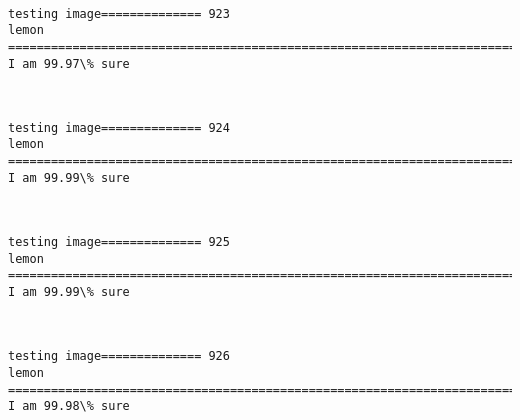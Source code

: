 \documentclass[11pt]{article}
\begin{document}
    \begin{center}
    \end{center}
    { \hspace*{\fill} \\}
    
    \begin{Verbatim}[commandchars=\\\{\}]
testing image============== 923
lemon
============================================================================
I am 99.97\% sure

    \end{Verbatim}

    \begin{center}
    \end{center}
    { \hspace*{\fill} \\}
    
    \begin{Verbatim}[commandchars=\\\{\}]
testing image============== 924
lemon
============================================================================
I am 99.99\% sure

    \end{Verbatim}

    \begin{center}
    \end{center}
    { \hspace*{\fill} \\}
    
    \begin{Verbatim}[commandchars=\\\{\}]
testing image============== 925
lemon
============================================================================
I am 99.99\% sure

    \end{Verbatim}

    \begin{center}
    \end{center}
    { \hspace*{\fill} \\}
    
    \begin{Verbatim}[commandchars=\\\{\}]
testing image============== 926
lemon
============================================================================
I am 99.98\% sure

    \end{Verbatim}
\end{document}
